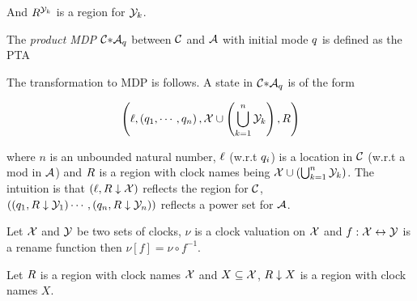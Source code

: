 And $R^{\mathcal{Y}_k}$ is a region for $\mathcal{Y}_k$.
\begin{definition}
The \emph{product MDP} ${\mathcal{C}}{\ast}{\mathcal{A}_q}$ between $\mathcal{C}$ and $\mathcal{A}$ with initial mode $q$ is defined as the PTA

\newcommand{\clocksN}{
    \clocksX \cup \left(
        \bigcup_{k=1}^{n} \clocksY_k
    \right )
}

The transformation to MDP is follows. A state in ${\mathcal{C}}{\ast}{\mathcal{A}_q}$ 
is of the form 

\begin{equation}\label{eq:state0}
    \left (
        \ell
        ,
        \left (
            q_1,
            \cdots,
            q_n
        \right )
        ,
        \mathcal{X} \cup \left( \bigcup_{k=1}^{n} \mathcal{Y}_k \right )
        ,
        R
    \right )
\end{equation}

where $n$ is an unbounded natural number, $\ell$ (w.r.t $q_i$) is a location in $\mathcal{C}$ 
(w.r.t a mod in $\mathcal{A}$) and $R$ is a region with clock names being $\mathcal{X} \cup \left( \bigcup_{k=1}^{n} \mathcal{Y}_k \right )$.
The intuition is that 
$
\left ( {\ell} , {{R} \downarrow {\mathcal{X}}} \right )
$ 
reflects the region for $\mathcal{C}$,
$ 
\left (
    \left ( {q_1} , {{R} \downarrow {\mathcal{Y}_1}} \right )
    \cdots,
    \left ( {q_n} , {{R} \downarrow {\mathcal{Y}_n}} \right )
\right )
$
reflects a power set for $\mathcal{A}$.
\end{definition}
% 
% 
\begin{definition}
Let $\mathcal{X}$ and $\mathcal{Y}$ be two sets of clocks, $\nu$ is a clock valuation on $\mathcal{X}$ and
$ f:\mathcal{X} \leftrightarrow \mathcal{Y} $ is a rename function then $ \nu[f]=\nu \circ f^{-1} $.
% 
\end{definition}
\begin{lemma}
Let $R$ is a region with clock names $\mathcal{X}$ and $X \subseteq \mathcal{X}$,
$
    {R} \downarrow {X}
$
is a region with clock names $X$.
\end{lemma}
